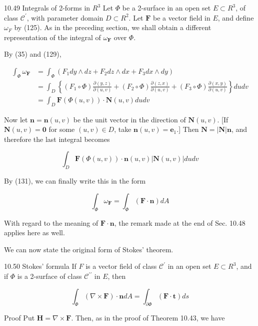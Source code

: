 \documentclass[10pt]{article}
\begin{document}
10.49 Integrals of 2-forms in $R^{3}$ Let $\Phi$ be a 2-surface in an open set $E \subset R^{3}$, of class $\mathscr{C}^{\prime}$, with parameter domain $D \subset R^{2}$. Let $\mathbf{F}$ be a vector field in $E$, and define $\omega_{F}$ by (125). As in the preceding section, we shall obtain a different representation of the integral of $\omega_{\mathbf{F}}$ over $\Phi$.

By (35) and (129),

$$
\begin{aligned}
\int_{\Phi} \omega_{\mathbf{F}} & =\int_{\Phi}\left(F_{1} d y \wedge d z+F_{2} d z \wedge d x+F_{3} d x \wedge d y\right) \\
& =\int_{D}\left\{\left(F_{1} \circ \Phi\right) \frac{\partial(y, z)}{\partial(u, v)}+\left(F_{2} \circ \Phi\right) \frac{\partial(z, x)}{\partial(u, v)}+\left(F_{3} \circ \Phi\right) \frac{\partial(x, y)}{\partial(u, v)}\right\} d u d v \\
& =\int_{D} \mathbf{F}(\Phi(u, v)) \cdot \mathbf{N}(u, v) d u d v
\end{aligned}
$$

Now let $\mathbf{n}=\mathbf{n}(u, v)$ be the unit vector in the direction of $\mathbf{N}(u, v)$. [If $\mathbf{N}(u, v)=\mathbf{0}$ for some $(u, v) \in D$, take $\mathbf{n}(u, v)=\mathbf{e}_{1}$.] Then $\mathbf{N}=|\mathbf{N}| \mathbf{n}$, and therefore the last integral becomes

$$
\int_{D} \mathbf{F}(\Phi(u, v)) \cdot \mathbf{n}(u, v)|\mathbf{N}(u, v)| d u d v
$$

By (131), we can finally write this in the form

$$
\int_{\Phi} \omega_{\mathbf{F}}=\int_{\Phi}(\mathbf{F} \cdot \mathbf{n}) d A
$$

With regard to the meaning of $\mathbf{F} \cdot \mathbf{n}$, the remark made at the end of Sec. 10.48 applies here as well.

We can now state the original form of Stokes' theorem.

10.50 Stokes' formula If $F$ is a vector field of class $\mathscr{C}^{\prime}$ in an open set $E \subset R^{3}$, and if $\Phi$ is a 2-surface of class $\mathscr{C}^{\prime \prime}$ in $E$, then

$$
\int_{\Phi}(\nabla \times \mathbf{F}) \cdot \mathbf{n} d A=\int_{\partial \Phi}(\mathbf{F} \cdot \mathbf{t}) d s
$$

Proof Put $\mathbf{H}=\nabla \times \mathbf{F}$. Then, as in the proof of Theorem 10.43, we have
\end{document}
